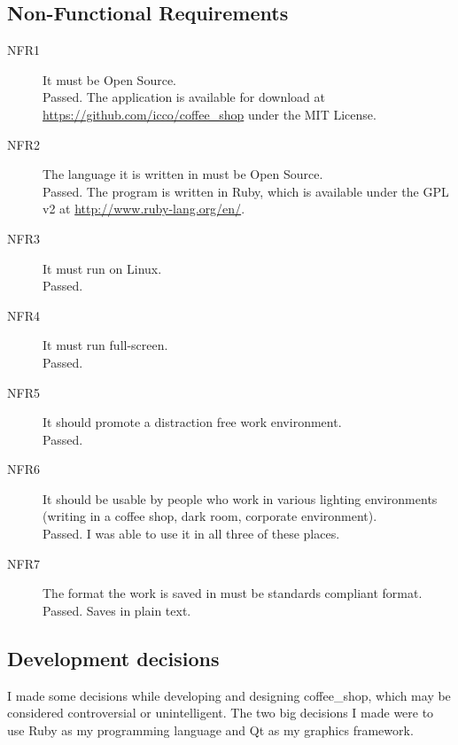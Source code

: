 \documentclass[10pt]{article}
\begin{document}
\subsection{Non-Functional Requirements}

\begin{description}

   \item[NFR1] It must be Open Source. \\ Passed. The application is available for download at \url{https://github.com/icco/coffee_shop} under the MIT License.

   \item[NFR2] The language it is written in must be Open Source. \\ Passed. The program is written in Ruby, which is available under the GPL v2 at \url{http://www.ruby-lang.org/en/}.

   \item[NFR3] It must run on Linux. \\ Passed.

   \item[NFR4] It must run full-screen. \\ Passed.

   \item[NFR5] It should promote a distraction free work environment. \\ Passed.

   \item[NFR6] It should be usable by people who work in various lighting environments (writing in a coffee shop, dark room, corporate environment). \\ Passed. I was able to use it in all three of these places.

   \item[NFR7] The format the work is saved in must be standards compliant format. \\ Passed. Saves in plain text.

\end{description}

\subsection{Development decisions}

I made some decisions while developing and designing coffee\_shop, which may be considered controversial or unintelligent. The two big decisions I made were to use Ruby as my programming language and Qt as my graphics framework.
\end{document}
